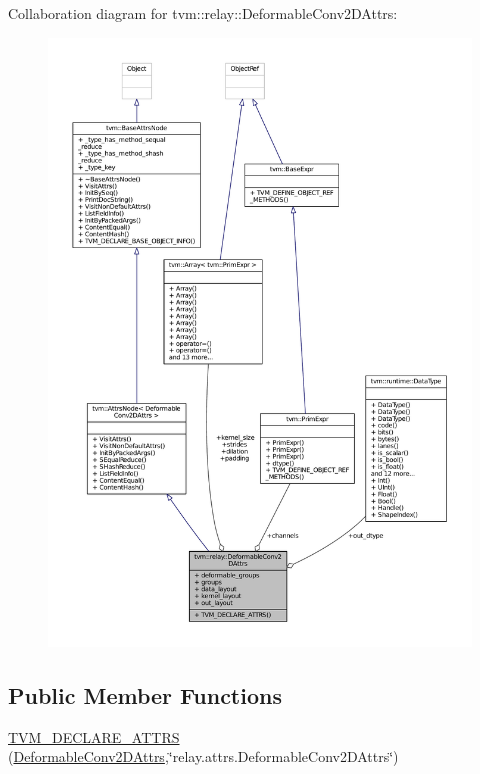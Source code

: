 Collaboration diagram for tvm\+:\+:relay\+:\+:Deformable\+Conv2\+D\+Attrs\+:
\nopagebreak
\begin{figure}[H]
\begin{center}
\leavevmode
\includegraphics[width=350pt]{structtvm_1_1relay_1_1DeformableConv2DAttrs__coll__graph}
\end{center}
\end{figure}
\subsection*{Public Member Functions}
\begin{DoxyCompactItemize}
\item 
\hyperlink{structtvm_1_1relay_1_1DeformableConv2DAttrs_af5aefee20997bddedc5acbe4cdb6692c}{T\+V\+M\+\_\+\+D\+E\+C\+L\+A\+R\+E\+\_\+\+A\+T\+T\+RS} (\hyperlink{structtvm_1_1relay_1_1DeformableConv2DAttrs}{Deformable\+Conv2\+D\+Attrs},\char`\"{}relay.\+attrs.\+Deformable\+Conv2\+D\+Attrs\char`\"{})
\end{DoxyCompactItemize}
